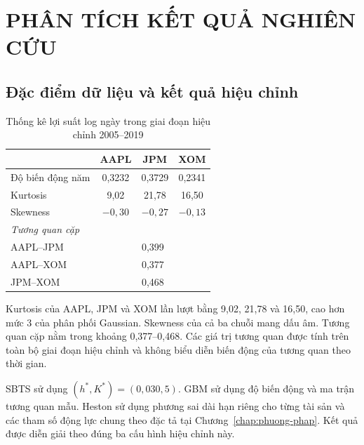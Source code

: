 
\chapter{PHÂN TÍCH KẾT QUẢ NGHIÊN CỨU}
\label{chap:ket-qua}

\section{Đặc điểm dữ liệu và kết quả hiệu chỉnh}
\label{sec:c4-data-calibration}

\begin{table}[H]
\centering
\small
\caption{Thống kê lợi suất log ngày trong giai đoạn hiệu chỉnh 2005--2019}
\label{tab:c4-descriptive}
\begin{tabular}{@{}lccc@{}}
\toprule
& \textbf{AAPL} & \textbf{JPM} & \textbf{XOM}\\
\midrule
Độ biến động năm & 0,3232 & 0,3729 & 0,2341\\
Kurtosis & 9,02 & 21,78 & 16,50\\
Skewness & $-0,30$ & $-0,27$ & $-0,13$\\
\midrule
\multicolumn{4}{l}{\textit{Tương quan cặp}}\\
AAPL--JPM & \multicolumn{3}{c}{0,399}\\
AAPL--XOM & \multicolumn{3}{c}{0,377}\\
JPM--XOM & \multicolumn{3}{c}{0,468}\\
\bottomrule
\end{tabular}
\end{table}

Kurtosis của AAPL, JPM và XOM lần lượt bằng 9,02, 21,78 và 16,50, cao hơn mức
3 của phân phối Gaussian. Skewness của cả ba chuỗi mang dấu âm. Tương quan cặp
nằm trong khoảng 0,377--0,468. Các giá trị tương quan được tính trên toàn bộ
giai đoạn hiệu chỉnh và không biểu diễn biến động của tương quan theo thời
gian.

SBTS sử dụng $(h^{*},K^{*})=(0{,}030,5)$. GBM sử dụng độ biến động và ma trận
tương quan mẫu. Heston sử dụng phương sai dài hạn riêng cho từng tài sản và
các tham số động lực chung theo đặc tả tại Chương~\ref{chap:phuong-phap}. Kết
quả được diễn giải theo đúng ba cấu hình hiệu chỉnh này.


